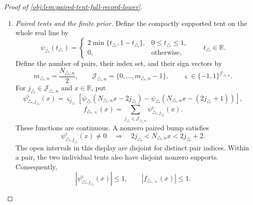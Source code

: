 \documentclass[11pt]{article}
\begin{document}
\begin{proof}[Proof of \cref{obj:lem:paired-tent-full-record-lower}]
\begin{enumerate}
\item \emph{Paired tents and the finite prior.}
Define the compactly supported tent on the whole real line by
\[
\psi_\triangle(t_\triangle)=
\begin{cases}
2\min\{t_\triangle,1-t_\triangle\},&0\le t_\triangle\le1,\\
0,&\text{otherwise},
\end{cases}
\qquad t_\triangle\in\mathbb R.
\]
Define the number of pairs, their index set, and their sign vectors by
\[
m_{\triangle,n}=\frac{N_{\triangle,n}}2,
\qquad
\mathscr J_{\triangle,n}=\{0,\ldots,m_{\triangle,n}-1\},
\qquad
\varsigma\in\{-1,1\}^{\mathscr J_{\triangle,n}}.
\]
For \(j_\triangle\in\mathscr J_{\triangle,n}\) and \(x\in\mathbb R\), put
\[
\psi_{\triangle,j_\triangle}^{\varsigma}(x)
=
\varsigma_{j_\triangle}
\left[
\psi_\triangle(N_{\triangle,n}x-2j_\triangle)
-\psi_\triangle(N_{\triangle,n}x-(2j_\triangle+1))
\right],
\]
\[
f_{\triangle,\varsigma}(x)
=
\sum_{j_\triangle\in\mathscr J_{\triangle,n}}
\psi_{\triangle,j_\triangle}^{\varsigma}(x).
\]
These functions are continuous. A nonzero paired bump satisfies
\[
\psi_{\triangle,j_\triangle}^{\varsigma}(x)\ne0
\quad\Longrightarrow\quad
2j_\triangle<N_{\triangle,n}x<2j_\triangle+2.
\]
The open intervals in this display are disjoint for distinct pair indices.
Within a pair, the two individual tents also have disjoint nonzero supports.
Consequently,
\[
\left|\psi_{\triangle,j_\triangle}^{\varsigma}(x)\right|\le1,
\qquad
|f_{\triangle,\varsigma}(x)|\le1.
\]


\end{enumerate}
\end{proof}
\end{document}
